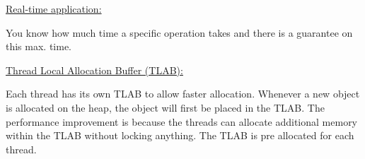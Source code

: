 


\par{
	\noindent\underline{Real-time application:}
	\par{\noindent You know how much time a specific operation takes and there is a guarantee on this max. time.}

	\noindent\underline{Thread Local Allocation Buffer (TLAB):}
	\par{
		\noindent
		Each thread has its own TLAB to allow faster allocation. Whenever a new object is allocated on the heap, the object will first be placed in the TLAB. The performance improvement is because the threads can allocate additional memory within the TLAB without locking anything. The TLAB is pre allocated for each thread.
	}
}

